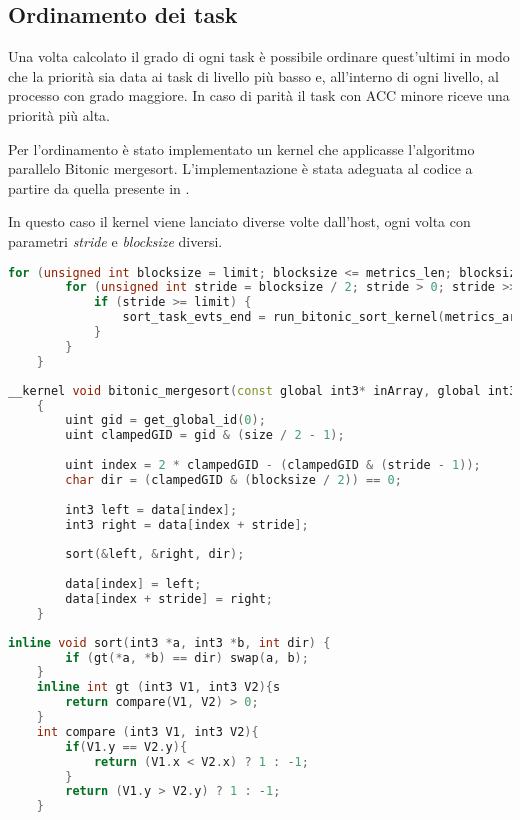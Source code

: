 \subsection{Ordinamento dei task}
Una volta calcolato il grado di ogni task è possibile ordinare quest'ultimi in modo che la priorità sia data ai task di livello più basso e, all'interno di ogni livello, al processo con grado maggiore.
In caso di parità il task con ACC minore riceve una priorità più alta.

Per l'ordinamento è stato implementato un kernel che applicasse l'algoritmo parallelo Bitonic mergesort. L'implementazione è stata adeguata al codice a partire da quella presente in \cite{parallelsort}.

In questo caso il kernel viene lanciato diverse volte dall'host, ogni volta con parametri \textit{stride} e \textit{blocksize} diversi.\\

\begin{lstlisting}[language=C++, caption={Bitonic mergesort codice host},captionpos=b]
	for (unsigned int blocksize = limit; blocksize <= metrics_len; blocksize <<= 1) {
		for (unsigned int stride = blocksize / 2; stride > 0; stride >>= 1) {
			if (stride >= limit) {
				sort_task_evts_end = run_bitonic_sort_kernel(metrics_array_len, stride, blocksize);
			}
		}
	}
\end{lstlisting}

\begin{lstlisting}[language=C++, caption={bitonic\_mergesort kernel, source: \url{https://github.com/Gram21/GPUSorting}},captionpos=b]
	__kernel void bitonic_mergesort(const global int3* inArray, global int3* outArray, const uint size, const uint blocksize, const uint stride)
	{
		uint gid = get_global_id(0);
		uint clampedGID = gid & (size / 2 - 1);
		
		uint index = 2 * clampedGID - (clampedGID & (stride - 1));
		char dir = (clampedGID & (blocksize / 2)) == 0;
		
		int3 left = data[index];
		int3 right = data[index + stride];
		
		sort(&left, &right, dir);
		
		data[index] = left;
		data[index + stride] = right;
	}
\end{lstlisting}
\newpage
\begin{lstlisting}[language=C++, caption={Funzioni necessarie al kernel bitonic\_mergesort},captionpos=b]
	inline void sort(int3 *a, int3 *b, int dir) {
		if (gt(*a, *b) == dir) swap(a, b);
	}
	inline int gt (int3 V1, int3 V2){s
		return compare(V1, V2) > 0;
	}
	int compare (int3 V1, int3 V2){
		if(V1.y == V2.y){
			return (V1.x < V2.x) ? 1 : -1;
		}
		return (V1.y > V2.y) ? 1 : -1;
	}
\end{lstlisting}


